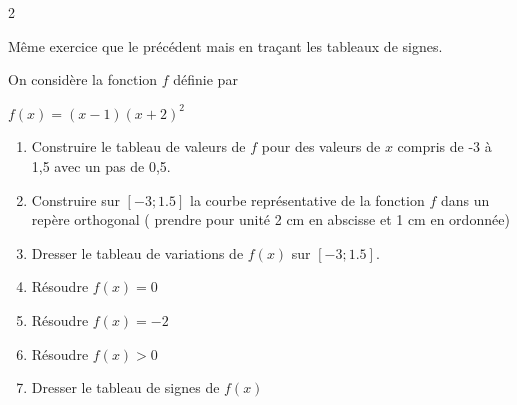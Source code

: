 \begin{multicols}{2}
\exo 

Même exercice que le précédent mais en traçant les tableaux de signes.

\medskip

\exo 

On considère la fonction $f$ définie par 

$f(x)= (x-1)(x+2)^2$

\begin{enumerate}
\item Construire le tableau de valeurs de $f$ pour des valeurs de $x$ compris de -3 à 1,5 avec un pas de 0,5.
\item Construire sur $[-3 ; 1.5]$ la courbe représentative de la fonction $f$ dans un repère orthogonal ( prendre pour unité 2 cm  en abscisse et 1 cm en ordonnée)
\item Dresser le tableau de variations de $f(x)$ sur $[-3 ; 1.5]$.
\item Résoudre $f(x)= 0$
\item Résoudre $f(x) = -2$
\item Résoudre $f(x) >0$
\item Dresser le tableau de signes de $f(x)$
\end{enumerate}
\end{multicols}

\exo 


